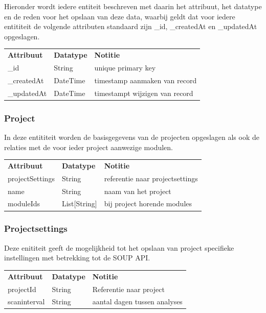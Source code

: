 Hieronder wordt iedere entiteit beschreven met daarin het attribuut, het datatype en de reden voor het opslaan van deze data, waarbij geldt dat voor iedere entititeit de volgende attributen standaard zijn \_id, \_createdAt en \_updatedAt opgeslagen.

\begin{tabular}{lll}
    \textbf{Attribuut} & \textbf{Datatype} & \textbf{Notitie}\\
    \_id & String & unique primary key\\
    \_createdAt & DateTime & timestamp aanmaken van record\\
    \_updatedAt & DateTime & timestampt wijzigen van record\\

\end{tabular}
\subsubsection{Project}\label{subsubsec:project}
In deze entititeit worden de basisgegevens van de projecten opgeslagen als ook de relaties met de voor ieder project aanwezige modulen.

\begin{tabular}{lll}
    \textbf{Attribuut} & \textbf{Datatype} & \textbf{Notitie}\\
    projectSettings & String & referentie naar projectsettings\\
    name & String & naam van het project\\
    moduleIds & List[String] & bij project horende modules\\

\end{tabular}
\subsubsection{Projectsettings}\label{subsubsec:projectsettings}
Deze enititeit geeft de mogelijkheid tot het opslaan van project specifieke instellingen met betrekking tot de SOUP API\@.

\begin{tabular}{lll}
    \textbf{Attribuut} & \textbf{Datatype} & \textbf{Notitie}\\
    projectId & String & Referentie naar project\\
    scaninterval  & String & aantal dagen tussen analyses\\
\end{tabular}

